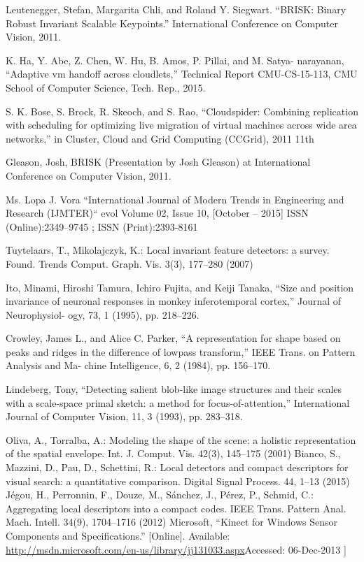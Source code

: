 \documentclass{report}           %
\begin{document}
\begin{thebibliography}{80}
Leutenegger, Stefan, Margarita Chli, and Roland Y. Siegwart. “BRISK: Binary Robust
Invariant Scalable Keypoints.” International Conference on Computer Vision, 2011.

 K. Ha, Y. Abe, Z. Chen, W. Hu, B. Amos, P. Pillai, and M. Satya- narayanan, “Adaptive vm handoff across cloudlets,” Technical Report CMU-CS-15-113, CMU School of Computer Science, Tech. Rep., 2015.

 S. K. Bose, S. Brock, R. Skeoch, and S. Rao, “Cloudspider: Combining replication with scheduling for optimizing live migration of virtual machines across wide area networks,” in Cluster, Cloud and Grid Computing (CCGrid), 2011 11th

  Gleason, Josh, BRISK (Presentation by Josh Gleason) at International Conference on
Computer Vision, 2011.

  Ms. Lopa J. Vora “International Journal of Modern Trends in Engineering and Research (IJMTER)“ evol Volume 02, Issue 10, [October – 2015] ISSN (Online):2349–9745 ; ISSN (Print):2393-8161

 Tuytelaars, T., Mikolajczyk, K.: Local invariant feature detectors: a survey. Found. Trends
Comput. Graph. Vis. 3(3), 177–280 (2007)

  Ito, Minami, Hiroshi Tamura, Ichiro Fujita, and Keiji
Tanaka, “Size and position invariance of neuronal responses
in monkey inferotemporal cortex,”
Journal of Neurophysiol-
ogy, 73, 1 (1995), pp. 218–226.


 Crowley, James L., and Alice C. Parker, “A representation
for shape based on peaks and ridges in the difference of lowpass
transform,”
IEEE Trans. on Pattern Analysis and Ma-
chine Intelligence,
6, 2 (1984), pp. 156–170.

Lindeberg, Tony, “Detecting salient blob-like image structures and their scales with a scale-space primal sketch:
a method for focus-of-attention,”
International Journal of
Computer Vision,
11, 3 (1993), pp. 283–318.



 Oliva, A., Torralba, A.: Modeling the shape of the scene: a holistic representation of the spatial
envelope. Int. J. Comput. Vis. 42(3), 145–175 (2001)
 Bianco, S., Mazzini, D., Pau, D., Schettini, R.: Local detectors and compact descriptors for
visual search: a quantitative comparison. Digital Signal Process. 44, 1–13 (2015)
 Jégou, H., Perronnin, F., Douze, M., Sánchez, J., Pérez, P., Schmid, C.: Aggregating local
descriptors into a compact codes. IEEE Trans. Pattern Anal. Mach. Intell. 34(9), 1704–1716
(2012)
Microsoft, “Kinect for Windows Sensor Components and Specifications.” [Online]. Available: \url{http://msdn.microsoft.com/en-us/library/jj131033.aspx}Accessed: 06-Dec-2013 ]


\end{thebibliography}
\end{document}
